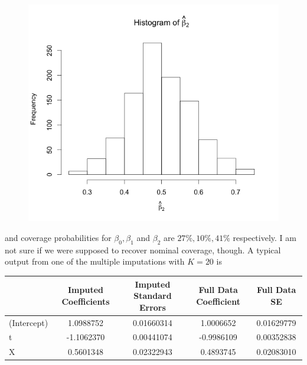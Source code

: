 \documentclass[11pt]{article}
\begin{document}
\begin{enumerate}
\begin{enumerate}
\begin{figure}[H]
				\includegraphics[scale=0.4]{Rplot1c3}
			\end{figure}
			and coverage probabilities for $\beta_0, \beta_1$ and $\beta_2$ are $27\%, 10\%, 41\%$ respectively. I am not sure if we were supposed to recover nominal coverage, though. A typical output from one of the multiple imputations with $K=20$ is
			\begin{table}[H]
			\centering
			\begin{tabular}{l|c|c|c|c|}
				              & Imputed Coefficients	 &  Imputed Standard Errors & Full Data Coefficient & Full Data SE \\
				              \hline
(Intercept)  & 1.0988752& 0.01660314 & 1.0006652 & 0.01629779\\
t          & -1.1062370 &0.00441074 & -0.9986109 & 0.00352838 \\
X          &  0.5601348 &0.02322943 & 0.4893745 & 0.02083010\\
			\end{tabular}
			\end{table}
		\end{enumerate}
	

\end{enumerate}
\end{document}
